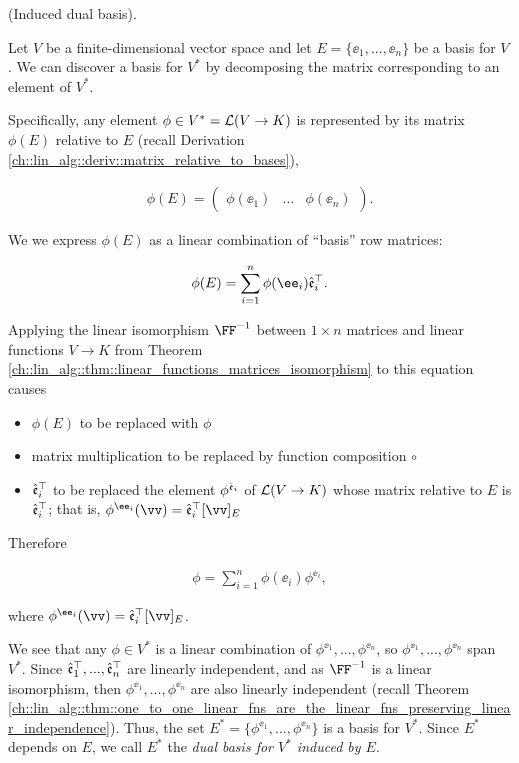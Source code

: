 \begin{deriv}
\label{ch::motivated_intro::deriv::induced_dual_basis}
    (Induced dual basis).
    
    Let $V$ be a finite-dimensional vector space and let $E = \{\ee_1, ..., \ee_n\}$ be a basis for $V$. We can discover a basis for $V^*$ by decomposing the matrix corresponding to an element of $V^*$.
    
    Specifically, any element ${\phi \in V^* = \mathcal{L}(V \rightarrow K)}$ is represented by its matrix $\phi(E)$ relative to $E$ (recall Derivation \ref{ch::lin_alg::deriv::matrix_relative_to_bases}),
    
    \begin{align*}
        \phi(E)
        =
        \begin{pmatrix} 
            \phi(\ee_1) & \hdots & \phi(\ee_n)
        \end{pmatrix}.
    \end{align*}
    
    We we express $\phi(E)$ as a linear combination of ``basis'' row matrices:
    
    \begin{align*}
        \phi(E) = \sum_{i = 1}^n \phi(\ee_i) \see_i^\top.
    \end{align*}
    
    Applying the linear isomorphism $\FF^{-1}$ between $1 \times n$ matrices and linear functions $V \rightarrow K$ from Theorem \ref{ch::lin_alg::thm::linear_functions_matrices_isomorphism} to this equation causes  \begin{itemize}
        \item $\phi(E)$ to be replaced with $\phi$
        \item matrix multiplication to be replaced by function composition $\circ$
        \item $\hat{\mathfrak{e}}_i^\top$ to be replaced the element $\phi^{\hat{\mathfrak{e}}_i}$ of $\mathcal{L}(V \rightarrow K)$ whose matrix relative to $E$ is $\hat{\mathfrak{e}}_i^\top$; that is, $\phi^{\ee_i}(\vv) = \see_i^\top [\vv]_E$
    \end{itemize}

    Therefore
    
    \begin{align*}
        \phi = \sum_{i = 1}^n \phi(\ee_i) \phi^{\ee_i},
    \end{align*}

    where $\phi^{\ee_i}(\vv) = \see_i^\top [\vv]_E$.
    
    We see that any $\phi \in V^*$ is a linear combination of $\phi^{\ee_1}, ..., \phi^{\ee_n}$, so $\phi^{\ee_1}, ..., \phi^{\ee_n}$ span $V^*$. Since $\hat{\mathfrak{e}}_1^\top, ..., \hat{\mathfrak{e}}_n^\top$ are linearly independent, and as $\FF^{-1}$ is a linear isomorphism, then $\phi^{\ee_1}, ..., \phi^{\ee_n}$ are also linearly independent (recall Theorem \ref{ch::lin_alg::thm::one_to_one_linear_fns_are_the_linear_fns_preserving_linear_independence}). Thus, the set ${E^* = \{\phi^{\ee_1}, ..., \phi^{\ee_n}\}}$ is a basis for $V^*$. Since $E^*$ depends on $E$, we call $E^*$ the \textit{dual basis for $V^*$ induced by $E$}.
\end{deriv}

